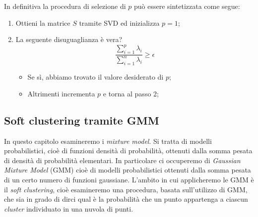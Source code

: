 In definitiva la procedura di selezione di $p$ può essere sintetizzata come segue:
\begin{enumerate}
\item Ottieni la matrice $S$ tramite SVD ed inizializza $p = 1$;
\item La seguente disuguaglianza è vera?
\begin{equation*}\frac{\sum_{i=1}^p \lambda_i}{\sum_{i=1}^n \lambda_i} \geq \epsilon\end{equation*}
\begin{itemize}
\item Se sì, abbiamo trovato il valore desiderato di $p$;
\item Altrimenti incrementa $p$ e torna al passo 2;
\end{itemize}
\end{enumerate}

\clearpage
\subsection{Soft clustering tramite GMM}

In questo capitolo esamineremo i \emph{mixture model}. Si tratta di modelli probabilistici, cioè di funzioni densità di probabilità, ottenuti dalla somma pesata di densità di probabilità elementari. In particolare ci occuperemo di \emph{Gaussian Mixture Model} (GMM) cioè di modelli probabilistici ottenuti dalla somma pesata di un certo numero di funzioni gaussiane. L'ambito in cui applicheremo le GMM è il \emph{soft clustering}, cioè esamineremo una procedura, basata sull'utilizzo di GMM, che sia in grado di dirci qual è la probabilità che un punto appartenga a ciascun \emph{cluster} individuato in una nuvola di punti.


